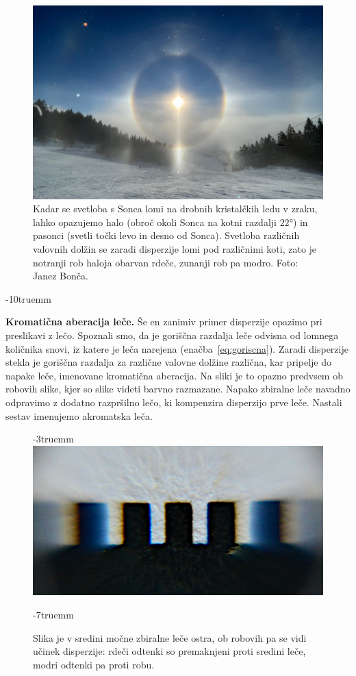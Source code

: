 \begin{figure}[!htp]
\centering
\includegraphics[width=93truemm]{slike/09_halo.jpg}
\caption{Kadar se svetloba s Sonca lomi na drobnih kristalčkih ledu v zraku, 
lahko opazujemo halo (obroč okoli Sonca na kotni razdalji $22\si{\degree}$) 
in pasonci (svetli točki levo in desno od Sonca). 
Svetloba različnih valovnih dolžin se zaradi disperzije lomi pod različnimi koti, zato je 
notranji rob haloja obarvan rdeče, zunanji rob pa modro. Foto: Janez Bonča.}
\label{fig:09_halo}
\end{figure}
\vglue-10truemm

\begin{example}{\bf Kromatična aberacija leče.} Še en zanimiv primer 
disperzije opazimo pri preslikavi z lečo. 
Spoznali smo, da je goriščna razdalja leče odvisna
od lomnega količnika snovi, iz katere je leča narejena 
(enačba~\ref{eq:goriscna}). Zaradi disperzije stekla
je goriščna razdalja za različne valovne dolžine različna,
kar pripelje do napake leče, imenovane kromatična
aberacija. Na sliki je to opazno predvsem 
ob robovih slike, kjer so slike videti barvno razmazane. 
Napako zbiralne leče navadno odpravimo z dodatno razpršilno lečo, ki kompenzira
disperzijo prve leče. Nastali sestav imenujemo akromatska leča.
\begin{figure}[ht!]
\vglue-3truemm
\centering
\includegraphics[width=6truecm]{slike/09_aberacija.jpg}
\caption{Slika je v sredini močne zbiralne leče ostra, ob robovih pa
se vidi učinek disperzije: rdeči odtenki so premaknjeni proti sredini 
leče, modri odtenki pa proti robu.}
\label{fig:09_aberacija}
\vglue-7truemm
\end{figure}

\end{example}

